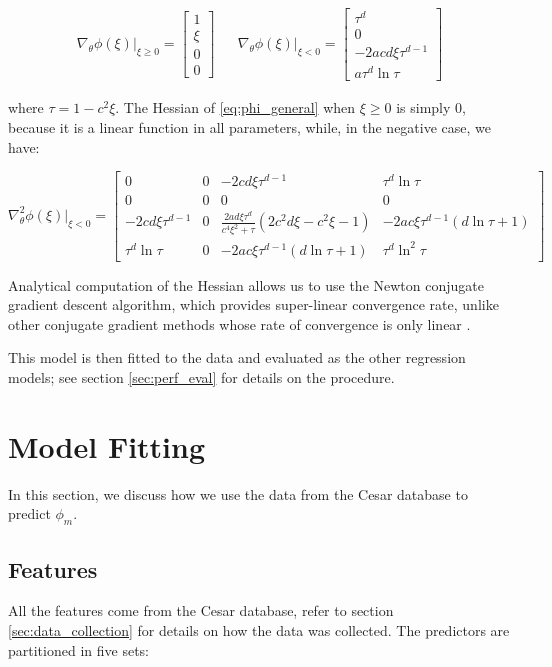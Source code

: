 \documentclass[12pt]{book}
\begin{document}
\begin{align}
\nabla_\theta\phi(\xi)\vert_{\xi\geq 0}=\begin{bmatrix}
1 \\ \xi \\ 0 \\ 0
\end{bmatrix} &&
\nabla_\theta\phi(\xi)\vert_{\xi<0}=\begin{bmatrix}
\tau^d \\ 0 \\ -2acd\xi\tau^{d-1} \\ a\tau^d\ln\tau
\end{bmatrix}
\end{align}

where $\tau=1-c^2\xi$. The Hessian of \ref{eq:phi_general} when $\xi\geq 0$ is simply 0, because it is a linear function in all parameters, while, in the negative case, we have:

\begin{equation}
\nabla^2_\theta\phi(\xi)\vert_{\xi<0} = \begin{bmatrix}
0 & 0 & - 2 c d \xi \tau^{d - 1} & \tau^{d} \ln{\tau} \\
0 & 0 & 0 & 0 \\
- 2 c d \xi \tau^{d - 1} &
0 & \frac{2ad\xi\tau^{d}}{c^4\xi^2+\tau}\left(2c^2d\xi-c^2\xi-1\right) & -2ac\xi\tau^{d-1}\left(d\ln\tau+1\right) \\
\tau^d \ln\tau & 0 &
-2ac\xi\tau^{d-1}\left(d\ln\tau+1\right) &
\tau^d\ln^2\tau
\end{bmatrix}
\end{equation}

Analytical computation of the Hessian allows us to use the Newton conjugate gradient descent algorithm, which provides super-linear convergence rate, unlike other conjugate gradient methods whose rate of convergence is only linear \citep{numopt}.

This model is then fitted to the data and evaluated as the other regression models; see section \ref{sec:perf_eval} for details on the procedure.

\section{Model Fitting}
\label{sec:model_fit}
In this section, we discuss how we use the data from the Cesar database to predict $\phi_m$.

\subsection{Features}
All the features come from the Cesar database, refer to section \ref{sec:data_collection} for details on how the data was collected. The predictors are partitioned in five sets:
\end{document}
